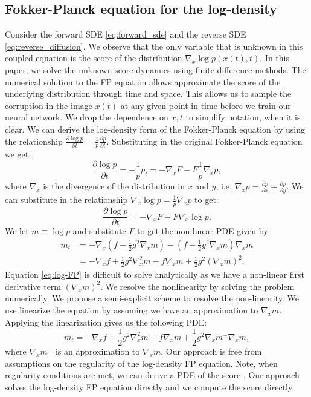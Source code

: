 \documentclass[]{interact}
\theoremstyle{plain}%
\theoremstyle{definition}
\theoremstyle{remark}
\begin{document}
\subsection{Fokker-Planck equation for the log-density}
Consider the forward SDE \eqref{eq:forward_sde} and the reverse SDE \eqref{eq:reverse_diffusion}. We observe that the only variable that is unknown in this coupled equation is the score of the distribution $\nabla_x \log p(x(t),t)$. In this paper, we solve the unknown score dynamics using finite difference methods. The numerical solution to the FP equation allows approximate the score of the underlying distribution through time and space. This allows us to sample the corruption in the image $x(t)$ at any given point in time before we train our neural network. We drop the dependence on $x,t$ to simplify notation, when it is clear. We can derive the log-density form of the Fokker-Planck equation by using the relationship $\frac{\partial \log p}{\partial t} = \frac{1}{p}\frac{\partial p}{\partial t}$. Substituting in the original Fokker-Planck equation we get:
\begin{equation}
   \frac{\partial\log p}{\partial t} = -\frac{1}{p}p_t = -\nabla_x F - F\frac{1}{p}\nabla_x p,
\end{equation}
where $\nabla_x$ is the divergence of the distribution in $x$ and $y$, i.e. $\nabla_x p = \frac{\partial p}{\partial x} + \frac{\partial p}{\partial y}$. We can substitute in the relationship $\nabla_x \log p = \frac{1}{p}\nabla_x p$ to get:
\begin{equation}
    \frac{\partial\log p}{\partial t} = -\nabla_xF - F\nabla_x\log p.
\end{equation}
We let $m\equiv \log p$ and substitute $F$ to get the non-linear PDE given by:
\begin{align}
    m_t &= -\nabla_x (f-\frac{1}{2}g^2\nabla_x m) - (f-\frac{1}{2}g^2\nabla_x m) \nabla_x m \nonumber\\ &= -\nabla_x f + \frac{1}{2}g^2\nabla_x^2 m - f\nabla_x m + \frac{1}{2}g^2 (\nabla_x m)^2.
    \label{eq:log-FP}
\end{align}
Equation \eqref{eq:log-FP} is difficult to solve analytically as we have a non-linear first derivative term $(\nabla_x m)^2$. We resolve the nonlinearity by solving the problem numerically. We propose a semi-explicit scheme to resolve the non-linearity. We use linearize the equation by assuming we have an approximation to $\nabla_x m$. Applying the linearization gives us the following PDE:
\begin{equation}
    m_t = -\nabla_x f + \frac{1}{2}g^2\nabla_x^2 m - f\nabla_x m + \frac{1}{2}g^2 \nabla_x m^{-}\nabla_x m,
\end{equation}
where $\nabla_x m^{-}$ is an approximation to $\nabla_x m$. Our approach is free from assumptions on the regularity of the log-density FP equation. Note, when regularity conditions are met, we can derive a PDE of the score \cite{lai-2022}. Our approach solves the log-density FP equation directly and we compute the score directly.
\end{document}
